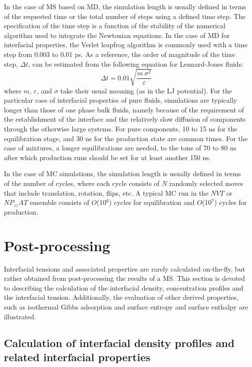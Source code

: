 \documentclass[9pt,tutorial]{livecoms}
\begin{document}
In the case of MS based on MD, the simulation length is usually defined in
terms of the requested time or the total number of steps using a defined time
step. The specification of the time step is a function of the stability of the
numerical algorithm used to integrate the Newtonian equations. In the case of
MD for interfacial properties, the Verlet leapfrog algorithm is commonly used
with a time step from 0.003 to 0.01 ps. As a reference, the order of magnitude 
of the time step, $\Delta t$, can be estimated from the following equation
for Lennard-Jones fluids:
\begin{equation}
\Delta t=0.01\sqrt{\frac{m\:\sigma^{2}}{\varepsilon}}
\end{equation}
where $m$, $\varepsilon$, and $\sigma$  take their usual meaning (as
in the LJ potential). For the particular case of interfacial properties of pure
fluids, simulations are typically longer than those of one phase bulk fluids,
namely because of the requirement of the establishment of the interface and the
relatively slow diffusion of components through the otherwise large systems.
For pure components, 10 to 15 ns for the equilibration stage, and 30 ns for the
production state are common times. For the case of mixtures, a longer
equilibrations are needed, to the tone of 70 to 80 ns after which production
runs should be set for at least another 150 ns.

In the case of MC simulations, the simulation length is usually defined in
terms of the number of cycles, where each cycle consists of $N$ randomly
selected moves that include translation, rotation, flips, etc. A typical MC run
in the $NVT$ or $NP_{zz}AT$ ensemble consists of
$O$(10$^{6}$) cycles for equilibration and $O$(10$^{7}$) cycles
for production.

\section{Post-processing}
\label{sec:post-proc}
Interfacial tensions and associated properties are rarely calculated
on-the-fly, but rather obtained from post-processing the results of a MS. This
section is devoted to describing the calculation of the interfacial density,
concentration profiles and the interfacial tension. Additionally, the evaluation
of other derived
properties, such as isothermal Gibbs adsorption and surface entropy and surface
enthalpy are illustrated. 

\subsection{Calculation of interfacial density profiles and related interfacial properties}
\end{document}
